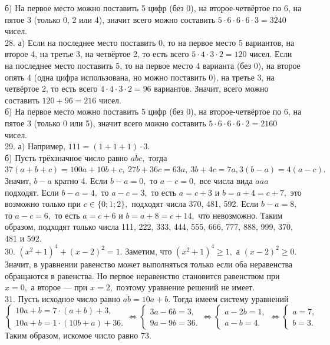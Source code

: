 \documentclass[12pt]{article}
\begin{document}
б) На первое место можно поставить 5 цифр (без 0), на второе-четвёртое по 6, на пятое 3 (только 0, 2 или 4), значит всего можно составить $5\cdot6\cdot6\cdot6\cdot3=3240$ чисел.\\
28. а) Если на последнее место поставить 0, то на первое место 5 вариантов, на второе 4, на третье 3, на четвёртое 2, то есть всего $5\cdot4\cdot3\cdot2=120$ чисел. Если на последнее место поставить 5, то на первое место 4 варианта (без 0), на второе опять 4 (одна цифра использована, но можно поставить 0), на третье 3, на четвёртое 2, то есть всего $4\cdot4\cdot3\cdot2=96$ вариантов. Значит, всего можно составить $120+96=216$ чисел.\\
б) На первое место можно поставить 5 цифр (без 0), на второе-четвёртое по 6, на пятое 3 (только 0 или 5), значит всего можно составить $5\cdot6\cdot6\cdot6\cdot2=2160$ чисел.\\
29. а) Например, $111=(1+1+1)\cdot3.$\\
б) Пусть трёхзначное число равно $\overline{abc},$ тогда $37(a+b+c)=100a+10b+c,\ 27b+36c=63a,\ 3b+4c=7a, 3(b-a)=4(a-c).$ Значит, $b-a$ кратно 4. Если $b-a=0,$ то $a-c=0,$ все числа вида $\overline{aaa}$ подходят. Если $b-a=4,$ то $a-c=3,$ то есть $a=c+3$ и $b=a+4=c+7,$ это возможно только при $c\in\{0;1;2\},$ подходят числа 370, 481, 592. Если $b-a=8,$ то $a-c=6,$ то есть $a=c+6$ и $b=a+8=c+14,$ что невозможно. Таким образом, подходят только числа 111, 222, 333, 444, 555, 666, 777, 888, 999, 370, 481 и 592.\\
30. $(x^2+1)^4+(x-2)^2=1.$ Заметим, что $(x^2+1)^4\geqslant1,$ а $(x-2)^2\geqslant0.$ Значит, в уравнении равенство может выполняться только если оба неравенства обращаются в равенства. Но первое неравенство становится равенством при $x=0,$ а второе --- при $x=2,$ поэтому уравнение решений не имеет.\\
31. Пусть исходное число равно $\overline{ab}=10a+b.$ Тогда имеем систему уравнений \\$\begin{cases} 10a+b=7\cdot(a+b)+3,\\ 10a+b=1\cdot(10b+a)+36.\end{cases}\Leftrightarrow \begin{cases} 3a-6b=3,\\ 9a-9b=36.\end{cases}\Leftrightarrow \begin{cases} a-2b=1,\\ a-b=4.\end{cases}
\Leftrightarrow \begin{cases} a=7,\\ b=3.\end{cases}$ Таким образом, искомое число равно 73.\\
\end{document}
